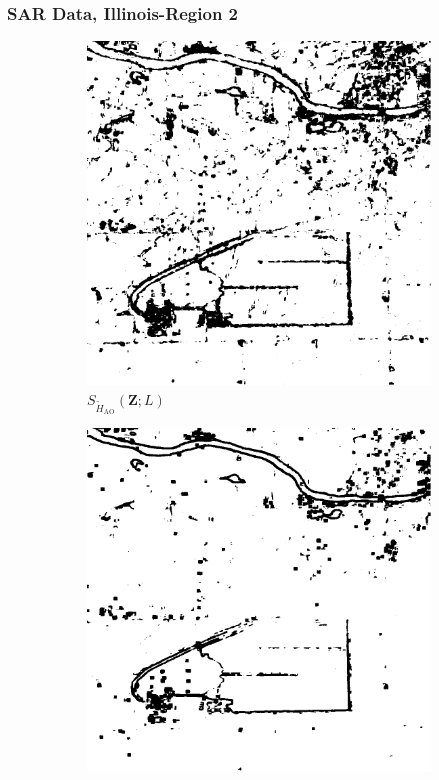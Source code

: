 \documentclass[aspectratio=1610,10pt]{beamer}
\begin{document}
\begin{frame} \frametitle{\large{SAR Data, Illinois-Region 2 }}\vspace{-0.1cm}
\begin{figure}[H]
  \centering
  \begin{subfigure}[b]{0.3\textwidth}
    \centering
    \includegraphics[width=\textwidth]{../../Figures/PNG/H_005_pvalues_Illinois_1024_36L_AO_200b}
    \caption{$S_{\widetilde{H}_{\text{AO}}}(\bm{Z}; L)$}
    \label{fig:Illinois_crops_0.05-1}
  \end{subfigure}
  \hfill
  \begin{subfigure}[b]{0.3\textwidth}
    \centering
    \includegraphics[width=\textwidth]{../../Figures/PNG/cv_005_pvalues_Illinois_crops_1024}

\end{subfigure}
\end{figure}
\end{frame}
\end{document}
